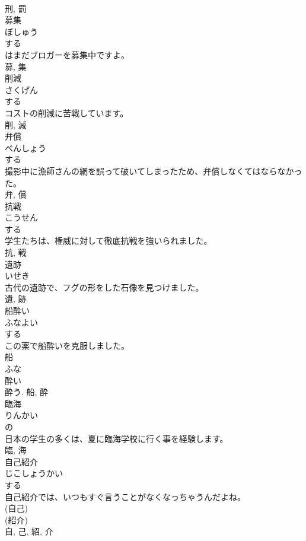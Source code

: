 \documentclass[8pt]{extreport}
\begin{document}
\begin{CJK}{UTF8}{min}
\\	刑, 罰	
\\	募集	
\\	ぼしゅう	
\\	する 
\\	はまだブロガーを募集中ですよ。	
\\	募, 集	
\\	削減	
\\	さくげん	
\\	する 
\\	コストの削減に苦戦しています。	
\\	削, 減	
\\	弁償	
\\	べんしょう	
\\	する 
\\	撮影中に漁師さんの網を誤って破いてしまったため、弁償しなくてはならなかった。	
\\	弁, 償	
\\	抗戦	
\\	こうせん	
\\	する 
\\	学生たちは、権威に対して徹底抗戦を強いられました。	
\\	抗, 戦	
\\	遺跡	
\\	いせき	
\\	古代の遺跡で、フグの形をした石像を見つけました。	
\\	遺, 跡	
\\	船酔い	
\\	ふなよい	
\\	する 
\\	この薬で船酔いを克服しました。	
\\	船 
\\	ふな 
\\	酔い 
\\	酔う.	船, 酔	
\\	臨海	
\\	りんかい	
\\	の 
\\	日本の学生の多くは、夏に臨海学校に行く事を経験します。	
\\	臨, 海	
\\	自己紹介	
\\	じこしょうかい	
\\	する 
\\	自己紹介では、いつもすぐ言うことがなくなっちゃうんだよね。	
\\	(自己) 
\\	(紹介) 
\\	自, 己, 紹, 介	

\end{CJK}
\end{document}
